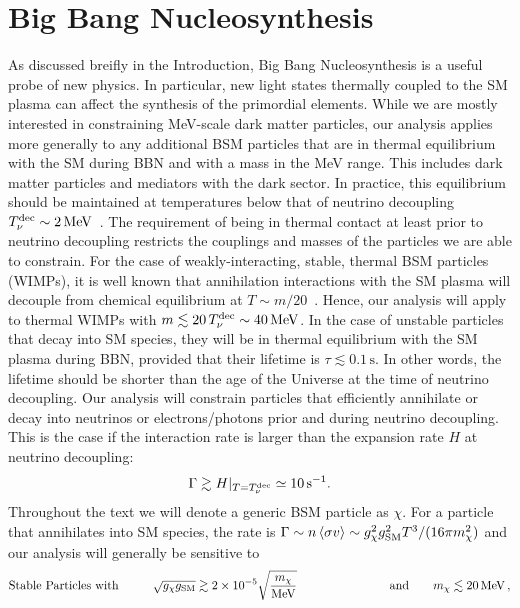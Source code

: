 \chapter{Big Bang Nucleosynthesis}\label{chap:bbn}

As discussed breifly in the Introduction, Big Bang Nucleosynthesis is a useful probe of new physics. In particular, new light states thermally coupled to the SM plasma can affect the synthesis of the primordial elements. While we are mostly interested in constraining MeV-scale dark matter particles, our analysis applies more generally to any additional BSM particles that are in thermal equilibrium with the SM during BBN and with a mass in the MeV range. This includes dark matter particles and mediators with the dark sector. In practice, this equilibrium should be maintained at temperatures below that of neutrino decoupling $T_\nu^{\rm dec} \sim 2\,\text{MeV}$~\cite{Dolgov:2002wy}. The requirement of being in thermal contact at least prior to neutrino decoupling restricts the couplings and masses of the particles we are able to constrain. For the case of weakly-interacting, stable, thermal BSM particles (WIMPs), it is well known that annihilation interactions with the SM plasma will decouple from chemical equilibrium at $T \sim m/20$~\cite{Kolb:1990vq}. Hence, our analysis will apply to thermal WIMPs with $m \lesssim 20\, T_\nu ^{\rm dec} \sim 40\,\text{MeV}$. In the case of unstable particles that decay into SM species, they will be in thermal equilibrium with the SM plasma during BBN, provided that their lifetime is $\tau \lesssim 0.1 \,\text{s}$. In other words, the lifetime should be shorter than the age of the Universe at the time of neutrino decoupling. Our analysis will constrain particles that efficiently annihilate or decay into neutrinos or electrons/photons prior and during neutrino decoupling. This is the case if the interaction rate is larger than the expansion rate $H$ at neutrino decoupling:
\begin{align}
    \Gamma \gtrsim H|_{T = T_\nu^{\rm dec}} \simeq 10 \,\text{s}^{-1}.
\end{align}
Throughout the text we will denote a generic BSM particle as $\chi$. For a particle that annihilates into SM species, the rate is $\Gamma \sim n\left<\sigma v \right> \sim g_\chi^2 g_{\rm SM}^2T^3/(16 \pi m_\chi^2)$ and our analysis will generally be sensitive to
\begin{align}\label{eq:Annihilation}
\text{Stable Particles with} \qquad  \,\,\,\,\,
    \sqrt{g_\chi g_{\rm SM}} \gtrsim  2\times 10^{-5} \sqrt{\frac{m_\chi}{\text{MeV}}} \qquad\qquad\qquad \,\,\,\,\,\,\,\,\,\, \text{and} \qquad m_\chi \lesssim 20\,\text{MeV}\,,
\end{align}
